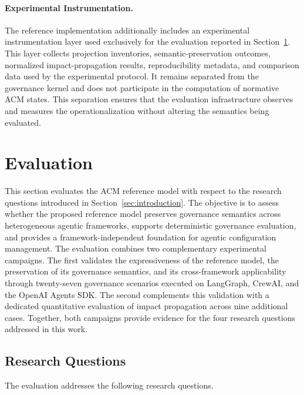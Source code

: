 \documentclass[10pt]{article}
\begin{document}
\paragraph{Experimental Instrumentation.}

The reference implementation additionally includes an experimental instrumentation layer used exclusively for the evaluation reported in Section~\ref{sec:evaluation}. This layer collects projection inventories, semantic-preservation outcomes, normalized impact-propagation results, reproducibility metadata, and comparison data used by the experimental protocol. It remains separated from the governance kernel and does not participate in the computation of normative ACM states. This separation ensures that the evaluation infrastructure observes and measures the operationalization without altering the semantics being evaluated.


\section{Evaluation}
\label{sec:evaluation}

This section evaluates the ACM reference model with respect to the research questions introduced in Section~\ref{sec:introduction}. The objective is to assess whether the proposed reference model preserves governance semantics across heterogeneous agentic frameworks, supports deterministic governance evaluation, and provides a framework-independent foundation for agentic configuration management. The evaluation combines two complementary experimental campaigns. The first validates the expressiveness of the reference model, the preservation of its governance semantics, and its cross-framework applicability through twenty-seven governance scenarios executed on LangGraph, CrewAI, and the OpenAI Agents SDK. The second complements this validation with a dedicated quantitative evaluation of impact propagation across nine additional cases. Together, both campaigns provide evidence for the four research questions addressed in this work.

\subsection{Research Questions}
\label{sec:research_questions}

The evaluation addresses the following research questions.
\end{document}
